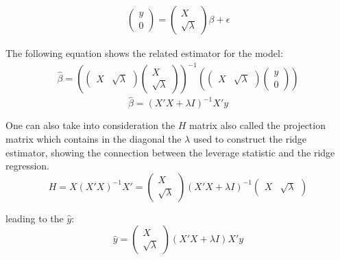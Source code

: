 \documentclass[12pt,onecolumn]{article}
\begin{document}
\begin{gather}
    \begin{pmatrix}
        y \\
        0
    \end{pmatrix} =
   \begin{pmatrix}
       X \\
       \sqrt{\lambda}
   \end{pmatrix}\beta+\epsilon
\end{gather}

The following equation shows the related estimator for the model:
\begin{gather}
    \hat{\beta}=\left(\begin{pmatrix}
        X&\sqrt{\lambda}
    \end{pmatrix}\begin{pmatrix}
        X \\ \sqrt{\lambda}
    \end{pmatrix}\right)^{-1}
    \left(\begin{pmatrix}
        X & \sqrt{\lambda}
    \end{pmatrix}\begin{pmatrix}
        y \\ 0
    \end{pmatrix}\right)
\end{gather}
\begin{equation*}
    \hat{\beta}=(X'X+\lambda{I})^{-1}X'y
\end{equation*}

One can also take into consideration the $H$ matrix also called the projection matrix which contains in the diagonal the $\lambda$ used to construct the ridge estimator, showing the connection between the leverage statistic and the ridge regression.
\begin{equation*}
    H=X(X'X)^{-1}X'=\begin{pmatrix}
        X \\ \sqrt{\lambda}
    \end{pmatrix}(X'X+\lambda{I})^{-1}\begin{pmatrix}
        X & \sqrt{\lambda}
    \end{pmatrix}
\end{equation*}

leading to the $\hat{y}$:
\begin{equation*}
    \hat{y}=\begin{pmatrix}
        X \\ \sqrt{\lambda}
    \end{pmatrix}(X'X+\lambda{I})X'y
\end{equation*}
\end{document}
